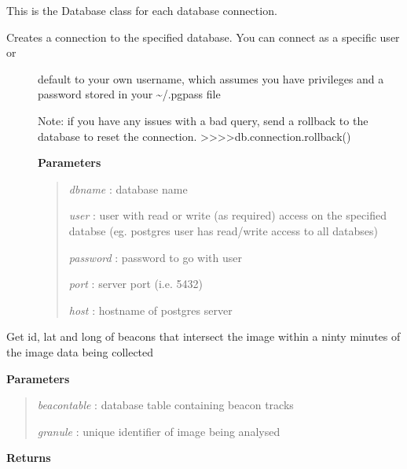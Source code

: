 \documentclass[letterpaper,10pt,openany,oneside]{sphinxmanual}
\begin{document}
\begin{fulllineitems}
\label{code:Database.Database}
This is the Database class for each database connection.
\begin{description}
\item[{Creates a connection to the specified database.  You can connect as a specific user or }] \leavevmode
default to your own username, which assumes you have privileges and a password stored in your  \textasciitilde{}/.pgpass file

Note: if you have any issues with a bad query, send a rollback to the database to reset the connection.
\textgreater{}\textgreater{}\textgreater{}\textgreater{}db.connection.rollback()

\textbf{Parameters}
\begin{quote}

\emph{dbname}   : database name

\emph{user}     : user with read or write (as required) access on the specified databse (eg. postgres user has read/write access to all databses)

\emph{password} : password to go with user

\emph{port}     : server port (i.e. 5432)

\emph{host}     : hostname of postgres server
\end{quote}

\end{description}

\begin{fulllineitems}
\label{code:Database.Database.beaconIntersections}
Get id, lat and long of beacons that intersect the image within a ninty minutes of the image data being collected

\textbf{Parameters}
\begin{quote}

\emph{beacontable} : database table containing beacon tracks

\emph{granule} : unique identifier of image being analysed
\end{quote}

\textbf{Returns}
\begin{quote}


\end{quote}
\end{fulllineitems}
\end{fulllineitems}
\end{document}
